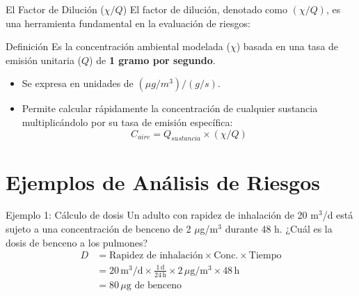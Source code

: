 \documentclass[10pt,compress]{beamer}
\begin{document}
\begin{frame}{El Factor de Dilución ($\chi/Q$)}
    El factor de dilución, denotado como $(\chi/Q)$, es una herramienta fundamental en la evaluación de riesgos:
    \begin{block}{Definición}
        Es la concentración ambiental modelada ($\chi$) basada en una tasa de emisión unitaria ($Q$) de \textbf{1 gramo por segundo}.
    \end{block}
    \begin{itemize}
        \item Se expresa en unidades de $(\mu g/m^3)/(g/s)$.
        \item Permite calcular rápidamente la concentración de cualquier sustancia multiplicándolo por su tasa de emisión específica: 
        \[ C_{aire} = Q_{sustancia} \times (\chi/Q) \]
    \end{itemize}
\end{frame}

\section{Ejemplos de Análisis de Riesgos}
\begin{frame}{Ejemplo 1: Cálculo de dosis}
Un adulto con rapidez de inhalación de 20 m$^3$/d está sujeto a una concentración de benceno de 2 $\mu$g/m$^3$ durante 48 h.
¿Cuál es la dosis de benceno a los pulmones?
\begin{align*}
D &= \text{Rapidez de inhalación} \times \text{Conc.} \times \text{Tiempo} \\
  &= 20 \, \text{m}^3/\text{d} \times \frac{1 \, \text{d}}{24 \, \text{h}} \times 2 \, \mu\text{g}/\text{m}^3 \times 48 \, \text{h} \\
  &= 80 \, \mu\text{g} \text{ de benceno}
\end{align*}
\end{frame}
\end{document}
